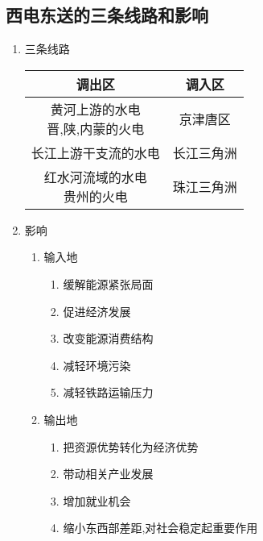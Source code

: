 \documentclass[a4paper]{article}
\begin{document}
    \subsection{西电东送的三条线路和影响}
    \begin{enumerate}
        \item 三条线路\\
            \begin{tabular}{|c|c|}
                \hline
                调出区  &   调入区  \\
                \hline
                \makecell[c]{黄河上游的水电\\晋,陕,内蒙的火电}  &   京津唐区    \\
                \hline
                长江上游干支流的水电    &   长江三角洲  \\
                \hline
                \makecell[c]{红水河流域的水电\\贵州的火电}  &   珠江三角洲  \\
                \hline
            \end{tabular}
        \item 影响
        \begin{enumerate}
            \item 输入地
            \begin{enumerate}
                \item 缓解能源紧张局面
                \item 促进经济发展
                \item 改变能源消费结构 %
                \item 减轻环境污染
                \item 减轻铁路运输压力
            \end{enumerate}
            \item 输出地
            \begin{enumerate}
                \item 把资源优势转化为经济优势
                \item 带动相关产业发展
                \item 增加就业机会
                \item 缩小东西部差距,对社会稳定起重要作用
            \end{enumerate}
        \end{enumerate}
    \end{enumerate}
\end{document}
